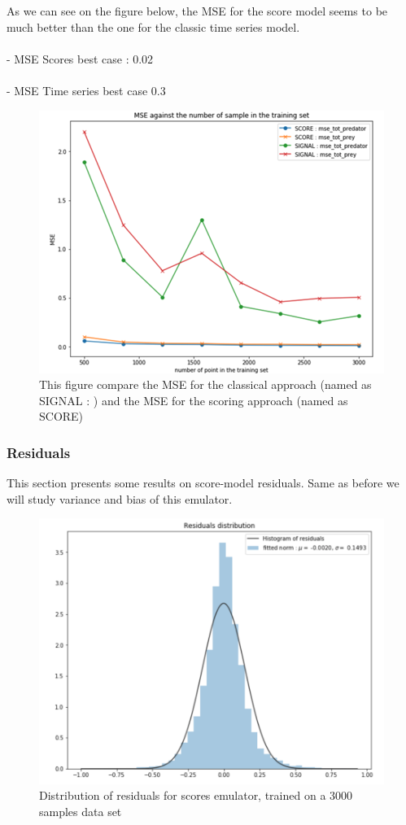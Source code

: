 \documentclass{article}
\begin{document}
As we can see on the figure below, the MSE for the score model seems to be much better than the one for the classic time series model. 
\\  
\\  
- MSE Scores best case : 0.02 \\
\\
- MSE Time series best case 0.3 \\ 

\begin{figure}[H]
\centering
\includegraphics[scale=0.6]{image/mse_comparison.png}
\caption{This figure compare the MSE for the classical approach (named as SIGNAL : ) and the MSE for the scoring approach (named as SCORE)}
\label{fig: Comparison_MSE}
\end{figure}

\subsubsection{Residuals}


This section presents some results on score-model residuals. Same as before we will study variance and bias of this emulator.   


\begin{figure}[H]
\centering
\includegraphics[scale=0.5]{image/score_distribution.png}
\caption{Distribution of residuals for scores emulator, trained on a 3000 samples data set}
\label{fig: scrore distrib}
\end{figure}  
\end{document}
